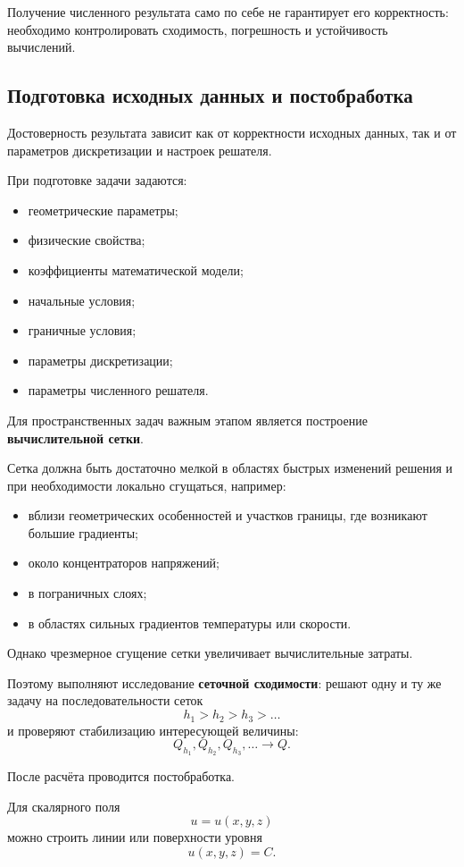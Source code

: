 Получение численного результата само по себе не гарантирует его корректность: необходимо контролировать сходимость, погрешность и устойчивость вычислений.

\subsection{Подготовка исходных данных и постобработка}

Достоверность результата зависит как от корректности исходных данных, так и от параметров дискретизации и настроек решателя.

При подготовке задачи задаются:
\begin{itemize}
	\item геометрические параметры;
	\item физические свойства;
	\item коэффициенты математической модели;
	\item начальные условия;
	\item граничные условия;
	\item параметры дискретизации;
	\item параметры численного решателя.
\end{itemize}

Для пространственных задач важным этапом является построение \textbf{вычислительной сетки}.

Сетка должна быть достаточно мелкой в областях быстрых изменений решения и при необходимости локально сгущаться, например:
\begin{itemize}
	\item вблизи геометрических особенностей и участков границы, где возникают большие градиенты;
	\item около концентраторов напряжений;
	\item в пограничных слоях;
	\item в областях сильных градиентов температуры или скорости.
\end{itemize}

Однако чрезмерное сгущение сетки увеличивает вычислительные затраты.

Поэтому выполняют исследование \textbf{сеточной сходимости}: решают одну и ту же задачу на последовательности сеток
\[
h_1>h_2>h_3>\ldots
\]
и проверяют стабилизацию интересующей величины:
\[
Q_{h_1},Q_{h_2},Q_{h_3},\ldots\rightarrow Q.
\]

После расчёта проводится постобработка.

Для скалярного поля
\[
u=u(x,y,z)
\]
можно строить линии или поверхности уровня
\[
u(x,y,z)=C.
\]

